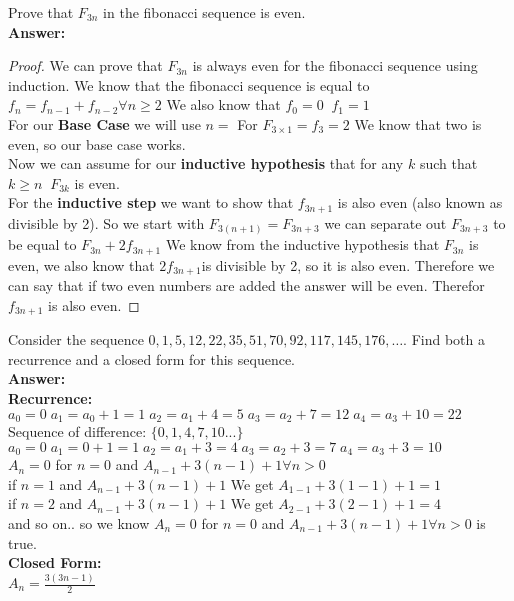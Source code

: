 \documentclass[12pt,letterpaper]{exam}
\begin{document}
\begin{questions}
\question[8,3]
Prove that $F_{3n}$ in the fibonacci sequence is even.
\\
\textbf{Answer:}
\\
\begin{proof}
We can prove that $F_{3n}$ is always even for the fibonacci sequence using induction. We know that the fibonacci sequence is equal to $ f_n=f_{n-1}+f_{n-2} \forall n \ge 2$ We also know that $f_0=0 \; \; f_1=1$
\\
For our \textbf{Base Case} we will use $n=$ For $F_{3 \times 1}=f_3=2$ We know that two is even, so our base case works.
\\
Now we can assume for our \textbf{inductive hypothesis} that for any $k$ such that $k \ge n \; \; F_{3k}$ is even.
\\
For the \textbf{inductive step} we want to show that $f_{3n+1}$ is also even (also known as divisible by 2). So we start with $F_{3(n+1)}=F_{3n+3}$ we can separate out $F_{3n+3}$ to be equal to $F_{3n}+2f_{3n+1}$ We know from the inductive hypothesis that $F_{3n}$ is even, we also know that $2f_{3n+1}$is divisible by 2, so it is also even. Therefore we can say that if two even numbers are added the answer will be even. Therefor $f_{3n+1}$ is also even.
\end{proof}

\question[8,6]
Consider the sequence $0,1,5,12,22,35,51,70,92,117,145,176,\ldots $. Find both a recurrence and a closed form for this sequence.
\\
\textbf{Answer:}
\\
\textbf{Recurrence:}
\\
$a_0=0 \; a_1=a_0+1=1 \; a_2=a_1+4=5 \; a_3=a_2+7=12 \; a_4=a_3+10=22$
\\
Sequence of difference: $\{0,1,4,7,10... \}$ 
\\
$a_0=0 \; a_1= 0+1=1 \; a_2=a_1+3=4 \; a_3=a_2+3=7 \; a_4=a_3+3=10 $
\\
$A_n = 0$ for $n = 0$ and $A_{n-1} + 3(n-1) + 1  \forall n > 0$
\\
if $n=1$ and $A_{n-1} + 3(n-1) + 1$ We get $A_{1-1} + 3(1-1) + 1=1$
\\
if $n=2$ and $A_{n-1} + 3(n-1) + 1$ We get $A_{2-1} + 3(2-1) + 1=4$
\\
and so on.. so we know $A_n = 0$ for $n = 0$ and $A_{n-1} + 3(n-1) + 1  \forall n > 0$ is true.
\\
\textbf{Closed Form:}
\\
$A_n=\frac{3(3n-1)}{2}$




\end{questions}
\end{document}
